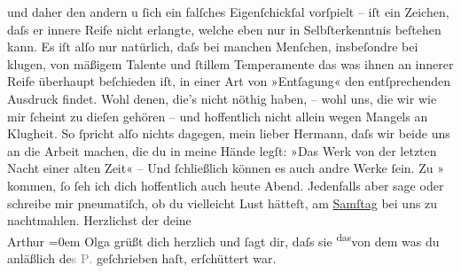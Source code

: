 \begin{ledgroupsized}[t]{13cm}
               und daher den andern u ſich ein \introOben{}falſches\introOben{} Eigenſchickſal
               vorſpielt – iſt ein Zeichen, daſs er innere Reife nicht erlangte, welche eben nur in
               Selbſterkenntnis beſtehen kann.  Es iſt {\pb}alſo nur natürlich,
               daſs bei manchen Menſchen, insbeſondre bei klugen, von mäßigem Talente und ſtillem
               Temperamente das was ihnen an innerer Reife überhaupt beſchieden iſt, in einer Art
               von »Entſagung« den entſprechenden Ausdruck findet.\pend
           \pstart
           Wohl denen, die’s nicht nöthig haben, – wohl uns, die wir wie mir ſcheint zu dieſen
               gehören – und hoffentlich nicht allein wegen Mangels an Klugheit. So ſpricht alſo
               nichts dagegen, mein lieber Hermann, daſs wir beide uns an die Arbeit machen, die du
               in meine {\pb}Hände legſt:
                  »\label{LL075-1v}Das Werk von der letzten Nacht einer alten
                  Zeit\label{LL075-1h}« – Und ſchließlich können es auch andre Werke ſein.\pend
           \pstart
           Zu »\label{K_L01477_3v}\label{K_L01477_3h}{ }kommen, ſo ſeh ich dich hoffentlich auch heute Abend.\pend
           \pstart
           Jedenfalls aber sage oder schreibe mir pneumatiſch, ob du vielleicht Lust hätteſt, am
                  \uline{Samſtag} bei uns zu nachtmahlen.\pend
           \pstart
           Herzlichst der deine{\\[\baselineskip]}\spacefill\mbox{Arthur{\pb}}\pend
           \leftskip=0em{}\pstart
           \noindent{}Olga grüßt dich herzlich und ſagt dir, daſs sie \substVorne{}\textsuperscript{das}\substDazwischen{}von dem\substHinten{} was du anläßlich de\textcolor{gray}{s \textsc{P}.}
                  geſchrieben haſt, erſchüttert war.\pend
           
         
         \endnumbering{}\end{ledgroupsized}  \newcommand{\dateiname}{L01477}\newcommand{\titel}{Arthur Schnitzler an Hermann Bahr, 14. 12. 1904}\newcommand{\editorInnen}{ Kurt Ifkovits,  Martin Anton Müller}
      